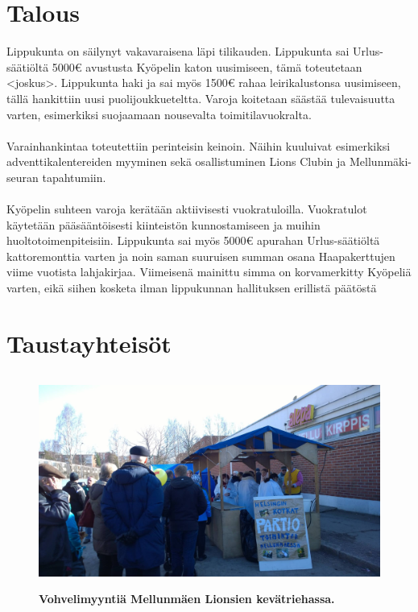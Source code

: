 \documentclass[a4paper, 12pt, finnish]{report} %
\begin{document}
\section{Talous}
Lippukunta on säilynyt vakavaraisena läpi tilikauden. Lippukunta sai Urlus-säätiöltä 5000\euro{} avustusta Kyöpelin katon uusimiseen, tämä toteutetaan <joskus>. Lippukunta haki ja sai myös 1500\euro{} rahaa leirikalustonsa uusimiseen, tällä hankittiin uusi puolijoukkueteltta. Varoja koitetaan säästää tulevaisuutta varten, esimerkiksi suojaamaan nousevalta toimitilavuokralta.\\
\\Varainhankintaa toteutettiin perinteisin keinoin. Näihin kuuluivat esimerkiksi adventtikalentereiden myyminen sekä osallistuminen Lions Clubin ja Mellunmäki-seuran tapahtumiin.\\
\\Kyöpelin suhteen varoja kerätään aktiivisesti vuokratuloilla. Vuokratulot käytetään pääsääntöisesti kiinteistön kunnostamiseen ja muihin huoltotoimenpiteisiin. Lippukunta sai myös 5000\euro{} apurahan Urlus-säätiöltä kattoremonttia varten ja noin saman suuruisen summan osana Haapakerttujen viime vuotista lahjakirjaa. Viimeisenä mainittu simma on korvamerkitty Kyöpeliä varten, eikä siihen kosketa ilman lippukunnan hallituksen erillistä päätöstä

\newpage
\section{Taustayhteisöt}
\begin{figure}[htb]
	\begin{center}
		\includegraphics[height=7cm]{lettukestit.jpg}
	\end{center}
	\captionsetup{labelformat=empty}
	\caption{\textbf{Vohvelimyyntiä Mellunmäen Lionsien kevätriehassa.}}
\end{figure}
\end{document}
